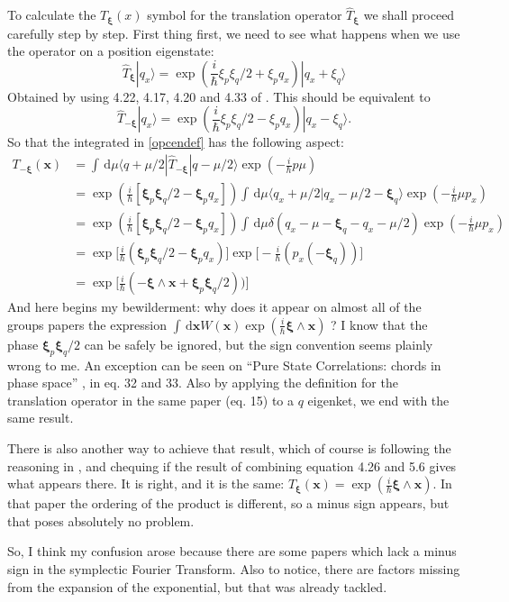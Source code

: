 \documentclass[a4paper,12pt]{article}
\newcommand{\ihb}{\frac{i}{\hbar}}
\newcommand{\xfase}{\mathbf{x}}
\newcommand{\xifase}{ {\boldsymbol{\xi}} }
\newcommand{\bra}[1]{\langle #1|}
\newcommand{\ket}[1]{|#1\rangle}
\newcommand{\braket}[2]{\langle #1|#2\rangle}
\newcommand{\rd}{\, \mathrm{d}}
\begin{document}
To calculate the $T_{\xifase}(x)$ symbol for the translation 
operator $\hat{T}_{\xifase}$ we shall proceed carefully step by step.
First thing first, we need to see what happens when we use
the operator on a position eigenstate:
\begin{equation}
\hat{T}_{\xifase}\ket{q_x}=
\exp(\ihb \xi_p\xi_q/2 + \xi_p q_x)\ket{q_x+\xi_q}
\end{equation}
Obtained by using 4.22, 4.17, 4.20 and 4.33 of \cite{Ozorio98}.
This should be equivalent to 
\begin{equation}
\hat{T}_{-\xifase}\ket{q_x}=
\exp(\ihb \xi_p\xi_q/2 - \xi_p q_x)\ket{q_x-\xi_q}.
\end{equation}
So that the integrated in \ref{opcendef} has the following aspect:
\begin{align}
T_{-\xifase}(\xfase)&= 
\int \rd \mu \bra{q+\mu/2}\hat{T}_{-\xifase}\ket{q-\mu/2}
\exp(-\ihb p \mu)\\
&=\exp (\ihb [\xifase_p\xifase_q/2-\xifase_p q_x])
\int \rd \mu \braket{q_x +\mu/2}{q_x -\mu/2-\xifase_q}
\exp  (-\ihb \mu p_x)\\
&=\exp (\ihb [\xifase_p\xifase_q/2-\xifase_p q_x])
\int \rd \mu \delta(q_x-\mu-\xifase_q-q_x-\mu/2) 
\exp  (-\ihb \mu p_x)\\
&=\exp\big[\ihb(\xifase_p\xifase_q/2-\xifase_p q_x)\big]
\exp\big[-\ihb(p_x (-\xifase_q))\big]\\
&=\exp\big[\ihb(-\xifase\wedge\xfase+\xifase_p\xifase_q/2))\big]
\end{align}
And here begins my bewilderment: why does it appear on almost all of the
groups papers the expression 
$\int \rd \xfase W(\xfase) \exp (\ihb \xifase\wedge\xfase)$ ?
I know that the phase $\xifase_p\xifase_q/2$ can be safely be
ignored, but the sign convention seems plainly wrong to me. An
exception can be seen on ``Pure State Correlations: chords in phase
space'' \cite{Ozorio05}, in eq. 32 and 33. Also by applying
the definition for the translation operator in the same paper 
(eq. 15) to a $q$ eigenket, we end with the same result. 

There is also another way to achieve that result, which of course
is following the reasoning in \cite{Ozorio98}, and chequing if
the result of combining equation 4.26 and  5.6 gives what appears there.
It is right, and it is the same: 
$T_\xifase(\xfase)=\exp(\ihb\xifase\wedge\xfase)$. In that paper the
ordering of the product is different, so a minus sign appears, but that poses
absolutely no problem.

So, I think my confusion arose because there are some papers which lack a minus
sign in the symplectic Fourier Transform. Also to notice, there are
factors missing from the expansion of the exponential, but that was already
tackled. 


\end{document}
